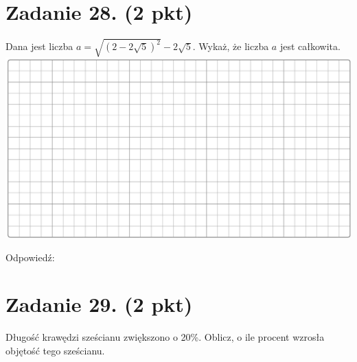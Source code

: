 \documentclass[10pt]{article}
\begin{document}
\section*{Zadanie 28. (2 pkt)}
Dana jest liczba \(a=\sqrt{(2-2 \sqrt{5})^{2}}-2 \sqrt{5}\). Wykaż, że liczba \(a\) jest całkowita.\\
\includegraphics[max width=\textwidth, center]{2024_11_21_a38d702bc7be8115942cg-10}

Odpowiedź:

\section*{Zadanie 29. (2 pkt)}
Długość krawędzi sześcianu zwiększono o 20\%. Oblicz, o ile procent wzrosła objętość tego sześcianu.
\end{document}
